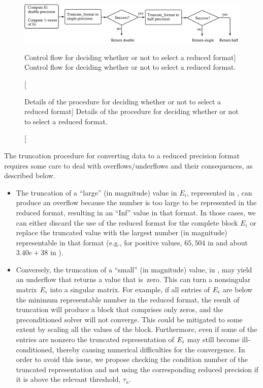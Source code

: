 \begin{figure}[t]
\begin{center}
    \includegraphics[width=\textwidth]{plots/control-flow}
    \caption
    [Control flow for deciding whether or not to select a reduced format]
    {Control flow for deciding whether or not to select a reduced format.}
    \label{2017-adaptive-block-jacobi:fig:control-flow}
\end{center} 
\end{figure}

\begin{figure}[t]

\caption
    [Details of the procedure for deciding whether or not to select a reduced
    format]
    {Details of the procedure for deciding whether or not to select a reduced
    format.}
\label{2017-adaptive-block-jacobi:fig:adaptive}
\end{figure}

The truncation procedure for converting \fpd data to a reduced precision format 
requires
some care to deal with overflows/underflows and their consequences, as 
described below.
\begin{itemize} 
    \item The truncation of a ``large'' (in magnitude) value in
    $E_i$, represented in \fpd, can produce an overflow because the number
    is too large to be represented in the reduced format, resulting in an 
    ``Inf''
    value in that format. In those cases, we can either discard the use of the
    reduced format for the complete block $E_i$ or replace the truncated value 
    with
    the largest number (in magnitude) representable in that format (e.g., for
    positive values, $65,504$ in \fph and about $3.40e+38$ in \fps). 
    \item Conversely, the truncation of a ``small'' (in magnitude) value, 
    in \fpd, may yield an underflow that returns a value that
    is~zero. This can turn a nonsingular matrix $E_i$ into a singular matrix. 
    For
    example, if all entries of $E_i$ are below the minimum representable 
    number in
    the reduced format, the result of truncation will produce a block that 
    comprises
    only zeros, and the preconditioned solver will not converge. This could be 
    mitigated to some extent by scaling all the values of the block. 
    Furthermore, even
    if some of the entries are nonzero the truncated representation of $E_i$ 
    may
    still become ill-conditioned, thereby causing numerical difficulties for 
    the convergence.
    In order to avoid this issue, we propose checking the condition number of 
    the
    truncated representation and not using the corresponding reduced
    precision if it is above the relevant threshold, $\tau_{\kappa}$. 
\end{itemize} 

